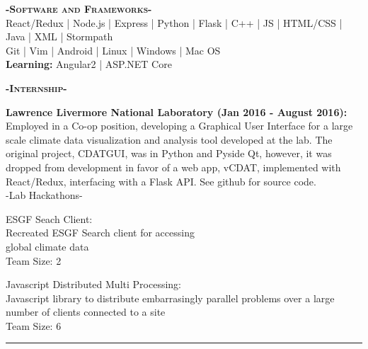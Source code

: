 \documentclass[12pt]{article}
\begin{document}
\center
\color{black}
\textbf{\textsc{-Software and Frameworks-}}\\
\medskip
\color{Cerulean}React/Redux | Node.js  | Express | Python | Flask  | C++ | JS | HTML/CSS | Java | XML | Stormpath\color{gray}\\
\smallskip
Git | Vim | Android | Linux | Windows | Mac OS\\
\smallskip
\textbf{Learning:}
Angular2 | ASP.NET Core
\color{black}
\begin{center}
\textbf{\textsc{-Internship-}}\\
\end{center}
\begin{footnotesize}

\flushleft
\color{Cerulean}\textbf{Lawrence Livermore National Laboratory (Jan 2016 - August 2016):} 
\color{Black}Employed in a Co-op position, developing a Graphical User Interface for a large scale climate data visualization and analysis tool developed at the lab. The original project, CDATGUI, was in \color{TealBlue}Python and Pyside Qt, \color{Black} however, it was dropped from development in favor of a web app, vCDAT, implemented with \color{TealBlue}React/Redux\color{Black}, interfacing with a \color{TealBlue}Flask \color{Black}API. See github for source code.\\

\center
-Lab Hackathons-
\begin{multicols}{2}
\center
\color{Cerulean}ESGF Seach Client:\\ \color{black}
Recreated ESGF Search client for accessing\\
global climate data\\
Team Size: 2

\columnbreak

\color{Cerulean}Javascript Distributed Multi Processing:\\ \color{black}
Javascript library to distribute embarrasingly parallel problems over a large number of clients connected to a site\\
Team Size: 6


\end{multicols}
\medskip

\end{footnotesize}

\noindent\rule{19cm}{0.4pt}
\end{document}
